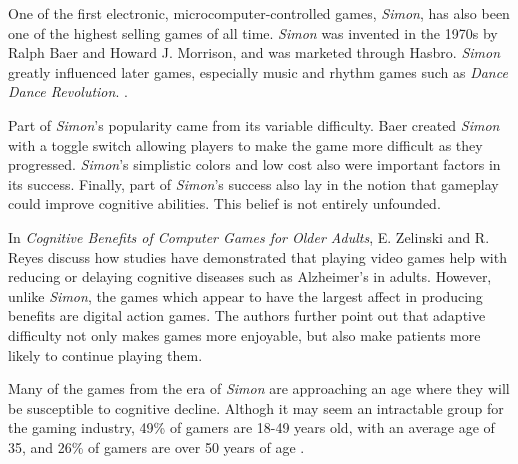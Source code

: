One of the first electronic, microcomputer-controlled games, \textit{Simon},
has also been one of the highest selling games of all time.  \textit{Simon}
was invented in the 1970s by Ralph Baer and Howard J. Morrison, and
was marketed through Hasbro.  \textit{Simon} greatly influenced later games,
especially music and rhythm games such as \textit{Dance Dance Revolution}.
\citep{austin2016}.

Part of \textit{Simon}'s popularity came from its variable difficulty.  Baer
created \textit{Simon} with a toggle switch allowing players to make the game
more difficult as they progressed.  \textit{Simon}'s simplistic colors and low
cost also were important factors in its success.  Finally, part of
\textit{Simon}'s success also lay in the notion that gameplay could improve
cognitive abilities.  This belief is not entirely unfounded.

In \textit{Cognitive Benefits of Computer Games for Older Adults},
E. Zelinski and R. Reyes discuss how studies have demonstrated that playing video
games help with reducing or delaying cognitive diseases such as
Alzheimer’s in adults.  However, unlike \textit{Simon}, the games which appear
to have the largest affect in producing benefits are digital action games.
The authors further point out that adaptive difficulty not only makes
games more enjoyable, but also make patients more likely to continue
playing them.

Many of the games from the era of \textit{Simon} are approaching an age
where they will be susceptible to cognitive decline.  Althogh it
may seem an intractable group for the gaming industry, 49\% of gamers
are 18-49 years old, with an average age of 35, and 26\% of gamers are
over 50 years of age \citep{zelinski2009}.
